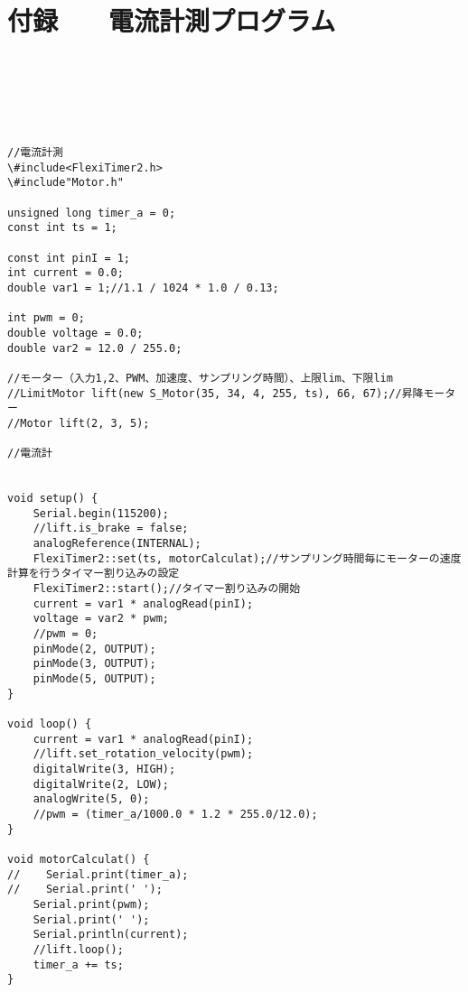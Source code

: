 \chapter{付録　　電流計測プログラム}
\begin{lstlisting}[basicstyle=\ttfamily\footnotesize]






//電流計測
\#include<FlexiTimer2.h>
\#include"Motor.h"

unsigned long timer_a = 0;
const int ts = 1;

const int pinI = 1;
int current = 0.0;
double var1 = 1;//1.1 / 1024 * 1.0 / 0.13;

int pwm = 0;
double voltage = 0.0;
double var2 = 12.0 / 255.0;

//モーター（入力1,2、PWM、加速度、サンプリング時間）、上限lim、下限lim
//LimitMotor lift(new S_Motor(35, 34, 4, 255, ts), 66, 67);//昇降モーター
//Motor lift(2, 3, 5);

//電流計


void setup() {
    Serial.begin(115200);
    //lift.is_brake = false;
    analogReference(INTERNAL);
    FlexiTimer2::set(ts, motorCalculat);//サンプリング時間毎にモーターの速度計算を行うタイマー割り込みの設定
    FlexiTimer2::start();//タイマー割り込みの開始
    current = var1 * analogRead(pinI);
    voltage = var2 * pwm;
    //pwm = 0;
    pinMode(2, OUTPUT);
    pinMode(3, OUTPUT);
    pinMode(5, OUTPUT);
}

void loop() {
    current = var1 * analogRead(pinI);
    //lift.set_rotation_velocity(pwm);
    digitalWrite(3, HIGH);
    digitalWrite(2, LOW);
    analogWrite(5, 0);
    //pwm = (timer_a/1000.0 * 1.2 * 255.0/12.0);
}

void motorCalculat() {
//    Serial.print(timer_a);
//    Serial.print(' ');
    Serial.print(pwm);
    Serial.print(' ');
    Serial.println(current);
    //lift.loop();
    timer_a += ts;
}

 \end{lstlisting}

